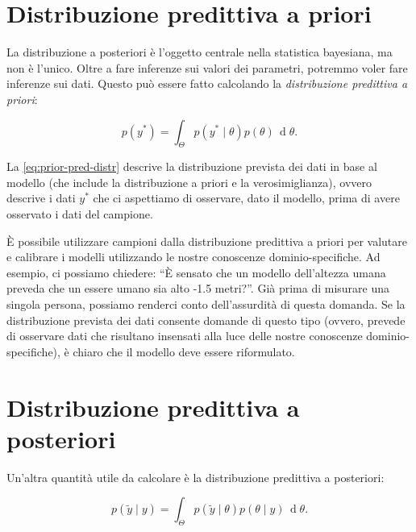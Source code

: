 \documentclass[
  11pt,
]{krantz}
\theoremstyle{definition}
\theoremstyle{definition}
\theoremstyle{definition}
\theoremstyle{definition}
\theoremstyle{remark}
\begin{document}
\hypertarget{distribuzione-predittiva-a-priori}{%
\section{Distribuzione predittiva a priori}\label{distribuzione-predittiva-a-priori}}

La distribuzione a posteriori è l'oggetto centrale nella statistica bayesiana, ma non è l'unico. Oltre a fare inferenze sui valori dei parametri, potremmo voler fare inferenze sui dati. Questo può essere fatto calcolando la \emph{distribuzione predittiva a priori}:

\begin{equation}
p(y^*) = \int_\Theta p(y^* \mid \theta) p(\theta) \,\operatorname {d}\!\theta .
\label{eq:prior-pred-distr}
\end{equation}

La \eqref{eq:prior-pred-distr} descrive la distribuzione prevista dei dati in base al modello (che include la distribuzione a priori e la verosimiglianza), ovvero descrive i dati \(y^*\) che ci aspettiamo di osservare, dato il modello, prima di avere osservato i dati del campione.

È possibile utilizzare campioni dalla distribuzione predittiva a priori per valutare e calibrare i modelli utilizzando le nostre conoscenze dominio-specifiche. Ad esempio, ci possiamo chiedere: ``È sensato che un modello dell'altezza umana preveda che un essere umano sia alto -1.5 metri?''. Già prima di misurare una singola persona, possiamo renderci conto dell'assurdità di questa domanda. Se la distribuzione prevista dei dati consente domande di questo tipo (ovvero, prevede di osservare dati che risultano insensati alla luce delle nostre conoscenze dominio-specifiche), è chiaro che il modello deve essere riformulato.

\hypertarget{distribuzione-predittiva-a-posteriori}{%
\section{Distribuzione predittiva a posteriori}\label{distribuzione-predittiva-a-posteriori}}

Un'altra quantità utile da calcolare è la distribuzione predittiva a posteriori:

\begin{equation}
p(\tilde{y} \mid y) = \int_\Theta p(\tilde{y} \mid \theta) p(\theta \mid y) \,\operatorname {d}\!\theta .
\label{eq:post-pred-distr}
\end{equation}
\end{document}
